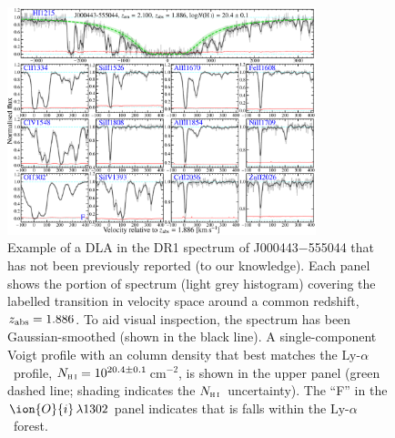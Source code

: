 \documentclass[fleqn,usenatbib,usedcolumn]{mnras}
\newcommand{\pcmsq}{\ensuremath{\textrm{cm}^{-2}}}
\newcommand{\lya}{\ensuremath{\textrm{Ly-}\alpha}}
\newcommand{\zab}{\ensuremath{z_\textrm{\scriptsize abs}}}
\newcommand{\NHI}{\ensuremath{N_\textsc{h\scriptsize{\,i}}}}
\newcommand{\tran}[3]{\ensuremath{\ion{#1}{#2}\,\lambda\textrm{#3}}}
\begin{document}
\begin{figure}
\begin{center}
\includegraphics[width=0.8\textwidth]{DR1_J000443_DLA.pdf}
\caption{Example of a DLA in the DR1 spectrum of J000443$-$555044 that has not been previously reported (to our knowledge). Each panel shows the portion of spectrum (light grey histogram) covering the labelled transition in velocity space around a common redshift, $\zab=1.886$. To aid visual inspection, the spectrum has been Gaussian-smoothed (shown in the black line). A single-component Voigt profile with an  column density that best matches the \lya\ profile, $\NHI=10^{20.4\pm0.1}$\,\pcmsq, is shown in the upper panel (green dashed line; shading indicates the \NHI\ uncertainty). The ``F'' in the \tran{O}{i}{1302} panel indicates that is falls within the \lya\ forest.}
\label{f:egDLA}
\end{center}
\end{figure}
\end{document}
